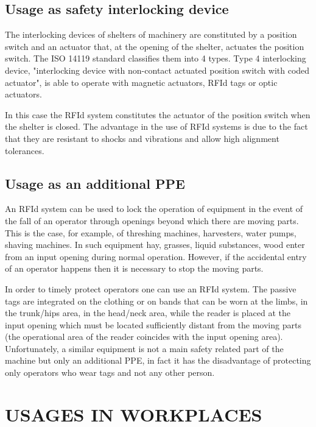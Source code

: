 \subsection[Usage as safety interlocking device]{Usage as safety interlocking device}
The interlocking devices of shelters of machinery are constituted by a position switch and an actuator that, at the opening of the shelter, actuates the position switch. The ISO 14119 standard classifies them into 4 types. Type 4 interlocking device, "interlocking device with non-contact actuated position switch with coded actuator", is able to operate with magnetic actuators, RFId tags or optic actuators.

\vspace*{1pc}
In this case the RFId system constitutes the actuator of the position switch when the shelter is closed. The advantage in the use of RFId systems is due to the fact that they are resistant to shocks and vibrations and allow high alignment tolerances. 

\subsection[Usage as an additional PPE]{Usage as an additional PPE}
An RFId system can be used to lock the operation of equipment in the event of the fall of an operator through openings beyond which there are moving parts. This is the case, for example, of threshing machines, harvesters, water pumps, shaving machines. In such equipment hay, grasses, liquid substances, wood enter from an input opening during normal operation. However, if the accidental entry of an operator happens then it is necessary to stop the moving parts. 

\vspace*{1pc}
In order to timely protect operators one can use an RFId system. The passive tags are integrated on the clothing or on bands that can be worn at the limbs, in the trunk/hips area, in the head/neck area, while the reader is placed at the input opening which must be located sufficiently distant from the moving parts (the operational area of the reader coincides with the input opening area). 
Unfortunately, a similar equipment is not a main safety related part of the machine but only an additional PPE, in fact it has the disadvantage of protecting only operators who wear tags and not any other person. 

\section[USAGES IN WORKPLACES]{\fontsize{14}{12}\selectfont USAGES IN WORKPLACES}

